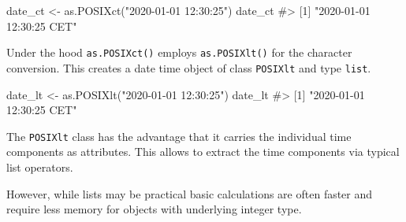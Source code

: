 \documentclass[
]{krantz}
\makeatletter
\newenvironment{Shaded}{\begin{snugshade}}{\end{snugshade}}
\newcommand{\CommentTok}[1]{\textcolor[rgb]{0.56,0.35,0.01}{\textit{#1}}}
\newcommand{\KeywordTok}[1]{\textcolor[rgb]{0.13,0.29,0.53}{\textbf{#1}}}
\newcommand{\NormalTok}[1]{#1}
\newcommand{\OperatorTok}[1]{\textcolor[rgb]{0.81,0.36,0.00}{\textbf{#1}}}
\newcommand{\StringTok}[1]{\textcolor[rgb]{0.31,0.60,0.02}{#1}}
\newenvironment{kframe}{%
\medskip{}
\setlength{\fboxsep}{.8em}
 \def\at@end@of@kframe{}%
 \ifinner\ifhmode%
  \def\at@end@of@kframe{\end{minipage}}%
  \begin{minipage}{\columnwidth}%
 \fi\fi%
 \def\FrameCommand##1{\hskip\@totalleftmargin \hskip-\fboxsep
 \colorbox{shadecolor}{##1}\hskip-\fboxsep
     \hskip-\linewidth \hskip-\@totalleftmargin \hskip\columnwidth}%
 \MakeFramed {\advance\hsize-\width
   \@totalleftmargin\z@ \linewidth\hsize
   \@setminipage}}%
 {\par\unskip\endMakeFramed%
 \at@end@of@kframe}
\renewenvironment{Shaded}{\begin{kframe}}{\end{kframe}}
\renewcommand{\KeywordTok} [1]{\textcolor[rgb]{0.00,0.44,0.13}{{#1}}}
\renewcommand{\StringTok}  [1]{\textcolor[rgb]{0.25,0.44,0.63}{{#1}}}
\renewcommand{\CommentTok} [1]{\textcolor[rgb]{0.38,0.63,0.69}{{#1}}}
\renewcommand{\NormalTok}  [1]{{#1}}
\makeatother
\begin{document}
\begin{Shaded}
\begin{Highlighting}[]
\NormalTok{date_ct <-}\StringTok{ }\KeywordTok{as.POSIXct}\NormalTok{(}\StringTok{"2020-01-01 12:30:25"}\NormalTok{)}
\NormalTok{date_ct}
\CommentTok{#> [1] "2020-01-01 12:30:25 CET"}
\end{Highlighting}
\end{Shaded}

Under the hood \texttt{as.POSIXct()} employs \texttt{as.POSIXlt()} for the character conversion. This creates a date time object of class \texttt{POSIXlt} and type \texttt{list}.

\begin{Shaded}
\begin{Highlighting}[]
\NormalTok{date_lt <-}\StringTok{ }\KeywordTok{as.POSIXlt}\NormalTok{(}\StringTok{"2020-01-01 12:30:25"}\NormalTok{)}
\NormalTok{date_lt}
\CommentTok{#> [1] "2020-01-01 12:30:25 CET"}
\end{Highlighting}
\end{Shaded}

The \texttt{POSIXlt} class has the advantage that it carries the individual time components as attributes. This allows to extract the time components via typical list operators.

\begin{Shaded}
\end{Shaded}

However, while lists may be practical basic calculations are often faster and require less memory for objects with underlying integer type.
\end{document}
